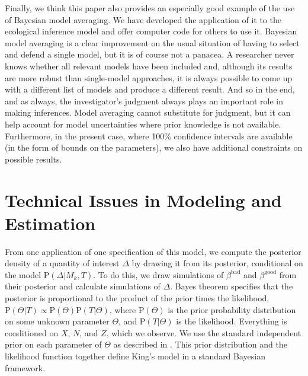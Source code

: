 \documentclass[11pt,titlepage]{article}
\renewcommand{\P}{\text{P}}
\newcommand{\bb}{\beta^{\text{bad}}}
\newcommand{\bg}{\beta^{\text{good}}}
\begin{document}
Finally, we think this paper also provides an especially good example
of the use of Bayesian model averaging.  We have developed the
application of it to the ecological inference model and offer computer
code for others to use it.  
Bayesian model averaging is a clear improvement on the usual situation
of having to select and defend a single model, but it is of course not
a panacea. A researcher never knows whether all relevant models have
been included and, although its results are more robust than
single-model approaches, it is always possible to come up with a
different list of models and produce a different result.  And so in
the end, and as always, the investigator's judgment always plays an
important role in making inferences.  Model averaging cannot
substitute for judgment, but it can help account for model
uncertainties where prior knowledge is not available. Furthermore, in
the present case, where 100\% confidence intervals are available (in
the form of bounds on the parameters), we also have additional
constraints on possible results.

\appendix
\section{Technical Issues in Modeling and Estimation} \label{appx:king}

From one application of one specification of this model, we compute
the posterior density of a quantity of interest $\Delta$ by drawing it
from its posterior, conditional on the model $\P(\Delta|M_k,T)$.  To
do this, we draw simulations of $\bb$ and $\bg$ from their posterior
and calculate simulations of $\Delta$.  Bayes theorem specifies that
the posterior is proportional to the product of the prior times the
likelihood, $\P(\Theta|T) \propto \P(\Theta)\P(T|\Theta)$, where
$\P(\Theta)$ is the prior probability distribution on some unknown
parameter $\Theta$, and $\P(T|\Theta)$ is the likelihood.  Everything
is conditioned on $X$, $N$, and $Z$, which we observe.  We use the
standard independent prior on each parameter of $\Theta$ as described
in \citet{king:97}.  This prior distribution and the likelihood
function together define King's model in a standard Bayesian
framework.
\end{document}
